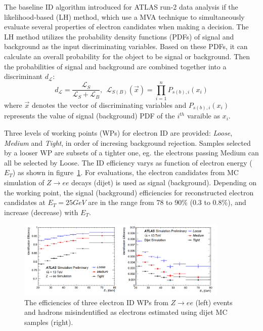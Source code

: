 The baseline ID algorithm introduced for ATLAS run-2 data analysis if the likelihood-based (LH) method, which use a MVA technique to simultaneously evaluate several properties of electron candidates when making a decision.
The LH method utilizes the probability density functions (PDFs) of signal and background as the input discriminating variables.
Based on these PDFs, it can calculate an overall probability for the object to be signal or background.
Then the probabilities of signal and background are combined together into a discriminant $d_{\mathcal{L}}$:
\begin{equation}
	d_{\mathcal{L}} = \frac{\mathcal{L}_{S}}{\mathcal{L}_{S} + \mathcal{L}_{B}},
	~~ \mathcal{L}_{S(B)}(\vec{x}) = \prod_{i=1}^{n} P_{s(b),i}(x_{i})	
\end{equation}
where $\vec{x}$ denotes the vector of discriminating variables and $P_{s(b),i}(x_{i})$ represents the value of signal (background) PDF of the $i^{th}$ varaible as $x_{i}$.

Three levels of working points (WPs) for electron ID are provided: \textit{Loose}, \textit{Medium} and \textit{Tight}, in order of incresing background rejection.
Samples selected by a looser WP are subsets of a tighter one, eg. the electrons passing Medium can all be selected by Loose.
The ID efficiency varys as function of electron energy ($E_{T}$) as shown in figure~\ref{fig:ele_IDeff}.
For evaluations, the electron candidates from MC simulation of $Z \rightarrow ee$ decays (dijet) is used as signal (background).
Depending on the working point, the signal (background) efficiencies for reconstructed electron candidates at $E_{T} = 25 GeV$ are in the range from 78 to 90\% (0.3 to 0.8\%), and increase (decrease) with $E_{T}$.
\begin{figure}[!htb]
  \centering
  \includegraphics[width=0.9\textwidth]{figures/Simulation/ele_id_eff.png}
  \caption{The efficiencies of three electron ID WPs from $Z \rightarrow ee$ (left) events and hadrons misindentified as electrons estimated using dijet MC samples (right).}
  \label{fig:ele_IDeff}
\end{figure}

